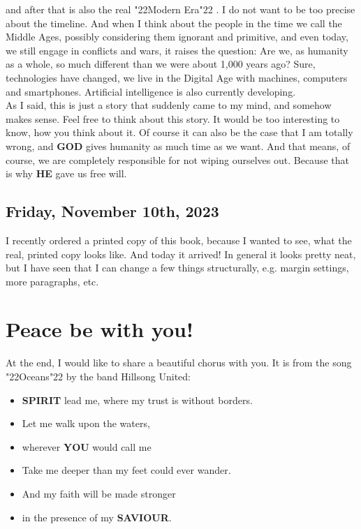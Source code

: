 \documentclass[12pt,a5paper]{article}
\newcommand{\God}[0]{\textbf{GOD}}
\newcommand{\He}[0]{\textbf{HE}}
\newcommand{\Saviour}[0]{\textbf{SAVIOUR}}
\newcommand{\Spirit}[0]{\textbf{SPIRIT}}
\newcommand{\You}[0]{\textbf{YOU}}
\newcommand{\q}[1]{\char"22{#1}\char"22 }
\begin{document}
		and after that is also the real \q{Modern Era}.
		I do not want to be too precise about the timeline.
		And when I think about the people in the time we call the Middle Ages,
		possibly considering them ignorant and primitive,
		and even today,
		we still engage in conflicts and wars,
		it raises the question:
		Are we,
		as humanity as a whole,
		so much different than we were about 1,000 years ago?
		Sure,
		technologies have changed,
		we live in the Digital Age with machines,
		computers and smartphones.
		Artificial intelligence is also currently developing.
		\\
		As I said,
		this is just a story that suddenly came to my mind,
		and somehow makes sense.
		Feel free to think about this story.
		It would be too interesting to know,
		how you think about it.
		Of course it can also be the case that I am totally wrong,
		and {\God} gives humanity as much time as we want.
		And that means,
		of course,
		we are completely responsible for not wiping ourselves out.
		Because that is why {\He} gave us free will.

	\subsection{Friday, November 10th, 2023}
		I recently ordered a printed copy of this book,
		because I wanted to see,
		what the real, printed copy looks like.
		And today it arrived!
		In general it looks pretty neat,
		but I have seen that I can change a few things structurally,
		e.g. margin settings,
		more paragraphs,
		etc.

	\newpage
	\section{Peace be with you!}
		At the end,
		I would like to share a beautiful chorus with you.
		It is from the song \q{Oceans} by the band Hillsong United:
		\\	
		\begin{itemize}[nosep]
			\item[]	{\Spirit} lead me,
					where my trust is without borders.
			\item[] Let me walk upon the waters,
			\item[] wherever {\You} would call me
			\item[]	Take me deeper than my feet could ever wander.
			\item[]	And my faith will be made stronger
			\item[]	in the presence of my {\Saviour}.
					\\
		\end{itemize}
		
\end{document}
